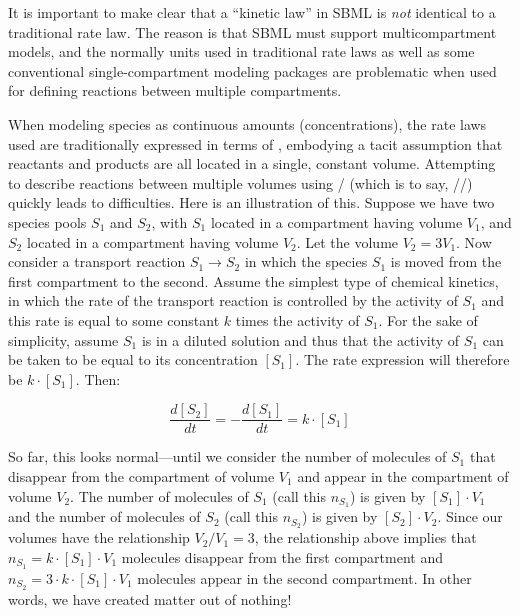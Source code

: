 
It is important to make clear that a ``kinetic law'' in SBML is
\emph{not} identical to a traditional rate law.  The reason is
that SBML must support multicompartment models, and the normally
units used in traditional rate laws as well as some conventional
single-compartment modeling packages are problematic when used for
defining reactions between multiple compartments.

When modeling species as continuous amounts (\eg concentrations),
the rate laws used are traditionally expressed in terms of
, embodying a
tacit assumption that reactants and products are all located in a
single, constant volume.  Attempting to describe reactions between
multiple volumes using /
(which is to say,
//) quickly
leads to difficulties.  Here is an illustration of this.  Suppose
we have two species pools $S_1$ and $S_2$, with $S_1$ located in a
compartment having volume $V_1$, and $S_2$ located in a
compartment having volume $V_2$.  Let the volume $V_2 = 3 V_1$.
Now consider a transport reaction $S_1 \rightarrow S_2$ in which
the species $S_1$ is moved from the first compartment to the
second.  Assume the simplest type of chemical kinetics, in which
the rate of the transport reaction is controlled by the activity
of $S_1$ and this rate is equal to some constant $k$ times the
activity of $S_1$.  For the sake of simplicity, assume $S_1$ is in
a diluted solution and thus that the activity of $S_1$ can be
taken to be equal to its concentration $[S_1]$.  The rate
expression will therefore be $k \cdot [S_1]$.  Then:
\begin{linenomath}
  \begin{equation*}
    \frac{d[S_2]}{dt} = -\frac{d[S_1]}{dt} = k \cdot [S_1]
  \end{equation*}
\end{linenomath}

So far, this looks normal---until we consider the number of
molecules of $S_1$ that disappear from the compartment of volume
$V_1$ and appear in the compartment of volume $V_2$.  The number
of molecules of $S_1$ (call this $n_{S_1}$) is given by $[S_1]
\cdot V_1$ and the number of molecules of $S_2$ (call this
$n_{S_2}$) is given by $[S_2] \cdot V_2$.  Since our volumes have
the relationship $V_2 / V_1 = 3$, the relationship above implies
that $n_{S_1} = k \cdot [S_1] \cdot V_1$ molecules disappear from
the first compartment and $n_{S_2} = 3 \cdot k \cdot [S_1] \cdot
V_1$ molecules appear in the second compartment.  In other words,
we have created matter out of nothing!

